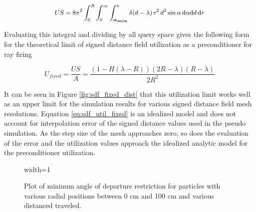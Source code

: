 \begin{equation}
\small US = 8\pi^2  \int_{0}^{R}\int_{0}^{\infty}\int_{\boldsymbol{\alpha_{min}}}^{\pi} \delta(d-\lambda) \,
r^2 \, d^2 \sin{\alpha} \, \mathrm{d}\alpha \mathrm{d}d \, \mathrm{d}r
\label{eq:subs_a_cond}
\end{equation}

Evaluating this integral and dividing by all query space gives the
following form for the theoretical limit of signed distance field utilization as a
preconditioner for ray firing

\begin{equation}
  U_{fixed} = \frac{US}{A} =  \frac{(1-H(\lambda-R))(2R-\lambda)(R-\lambda)}{2R^2}
  \label{eq:sdf_util_fixed}
\end{equation}

It can be seen in Figure \ref{fig:sdf_fixed_dist} that this utilization limit
works well as an upper limit for the simulation results for various signed
distance field mesh resolutions. Equation \ref{eq:sdf_util_fixed} is an
idealized model and does not account for interpolation error of the signed
distance values used in the pseudo simulation. As the step size of the mesh
approaches zero, so does the evaluation of the error and the utilization values
approach the idealized analytic model for the preconditioner utilization.


\begin{figure}[H]
  \centering
  {width=1\textwidth}
  \caption{Plot of mininum angle of departure restriction for particles with
    various radial positions between 0 cm and 100 cm and various distanced traveled.}
 \label{fig:alpha_min}
\end{figure}


